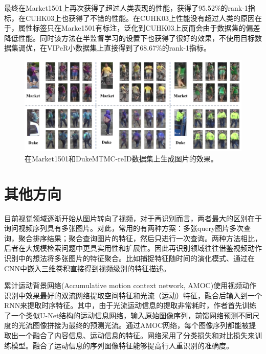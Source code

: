 最终在Market1501上再次获得了超过人类表现的性能，获得了95.52\%的rank-1指标，在CUHK03上也获得了不错的性能。在CUHK03上性能没有超过人类的原因在于，属性标签只在Marke1501有标注，泛化到CUHK03上反而会由于数据集的偏差降低性能。同时该方法在半监督学习的设置下也获得了很好的效果，不使用目标数据集调优，在VIPeR小数据集上直接得到了68.67\%的rank-1指标。

\begin{figure}
	\centering
	\captionsetup{width=.88\linewidth}
	\includegraphics[width=\linewidth,keepaspectratio]{data/kaitibaogao/vis.png}
	\caption{\kaiti 在Market1501和DukeMTMC-reID数据集上生成图片的效果。}
	\label{figure:vis}
\end{figure}

\section{其他方向}

目前视觉领域逐渐开始从图片转向了视频，对于再识别而言，两者最大的区别在于询问视频序列具有多张图片。对此，常用的有两种方案：多张query图片多次查询，聚合排序结果；聚合查询图片的特征，然后只进行一次查询。两种方法相比，后者在大规模检索问题中更具实用性和扩展性。因此再识别领域往往借鉴视频动作识别中的想法将多张图片的特征聚合。比如捕捉特征随时间的演化模式、通过在CNN中嵌入三维卷积直接得到视频级别的特征描述。

累计运动背景网络(Accumulative motion context network, AMOC)\cite{liu2017video}使用视频动作识别中效果最好的双流网络提取空间特征和光流（运动）特征，融合后输入到一个RNN来提取时序特征。其中，由于光流运动信息的提取非常耗时，作者首先训练了一个类似U-Net结构的运动信息网络，输入原始图像序列，前馈网络预测不同尺度的光流图像拼接为最终的预测光流。通过AMOC网络，每个图像序列都能被提取出一个融合了内容信息、运动信息的特征。网络采用了分类损失和对比损失来训练模型。融合了运动信息的序列图像特征能够提高行人重识别的准确度。

